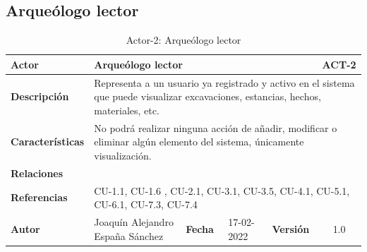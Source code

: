\subsection{Arqueólogo lector}
    \begin{table}[H]
    \begin{center}
        \begin{adjustbox}{width=\textwidth}
        \begin{tabular}{ | l | l | l | l | c | c | } 
            \hline
            \textbf{Actor} & \multicolumn{4}{l|}{ Arqueólogo lector} & \cellcolor{gray!50} \textbf{ACT-2}\\
            \hline
            \textbf{Descripción} & \multicolumn{5}{p{0.5\linewidth}|}{Representa a un usuario
            ya registrado y activo en el sistema que puede visualizar excavaciones, estancias,
            hechos, materiales, etc.} \\
            \hline
            \textbf{Características} & \multicolumn{5}{p{0.5\linewidth}|}{No podrá realizar
            ninguna acción de añadir, modificar o eliminar algún elemento del sistema,
            únicamente visualización.} \\
            \hline
            \textbf{Relaciones} & \multicolumn{5}{p{0.5\linewidth}|}{ } \\
            \hline
            \textbf{Referencias} & \multicolumn{5}{p{0.5\linewidth}|}{CU-1.1, CU-1.6 , CU-2.1,
            CU-3.1, CU-3.5, CU-4.1, CU-5.1, CU-6.1, CU-7.3, CU-7.4} \\
            \hline
            \textbf{Autor} & \multicolumn{1}{p{0.25\linewidth}|}{Joaquín Alejandro España Sánchez} & \textbf{Fecha} & 
            17-02-2022     & \textbf{Versión}                                                      & 1.0\\
            \hline
        \end{tabular}
        \end{adjustbox}
        \caption{Actor-2: Arqueólogo lector}
        \label{tab:archaeologist-reader}
    \end{center}
    \end{table}


